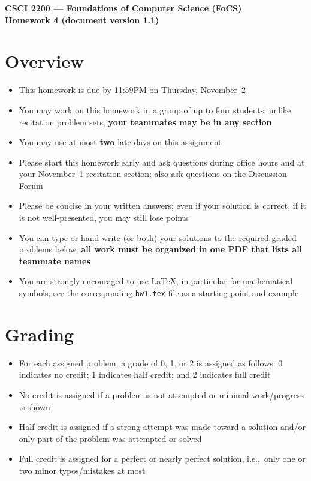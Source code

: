 \documentclass[11pt]{article}
\begin{document}
\thispagestyle{empty}

\begin{center}
\large
\textbf{CSCI 2200 --- Foundations of Computer Science (FoCS) \\
Homework 4 (document version 1.1)}
\end{center}

\section*{Overview}
\begin{itemize}
\item This homework is due by 11:59PM on Thursday, November~2
\item You may work on this homework in a group of up to four students;
  unlike recitation problem sets,
  \textbf{your teammates may be in any section}
\item You may use at most \textbf{two} late days on this assignment
\item Please start this homework early and ask questions during
  office hours and at your November~1 recitation section;
  also ask questions on the Discussion Forum
\item Please be concise in your written answers;
  even if your solution is correct, if it is not well-presented,
  you may still lose points
\item You can type or hand-write (or both) your solutions
  to the required graded problems below;
  \textbf{all work must be organized in one PDF that lists
  all teammate names}
\item You are strongly encouraged to use LaTeX, in particular for
  mathematical symbols;
  see the corresponding \verb+hw1.tex+ file as a starting point
  and example
\end{itemize}


\section*{Grading}
\begin{itemize}
\item For each assigned problem, a grade of 0, 1, or 2 is assigned
  as follows:
  0 indicates no credit;
  1 indicates half credit;
  and 2 indicates full credit
\item No credit is assigned if a problem is not attempted
  or minimal work/progress is shown
\item Half credit is assigned if a strong attempt was made
  toward a solution and/or only part of the problem was attempted or solved
\item Full credit is assigned for a perfect or nearly perfect solution,
  i.e.,~only one or two minor typos/mistakes at most
\end{itemize}
\end{document}
